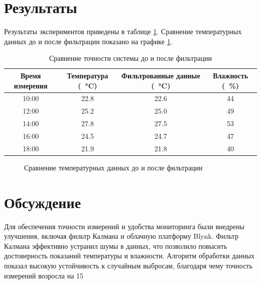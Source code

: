 \documentclass[a4paper,12pt]{article}
\begin{document}
\section{Результаты}
Результаты экспериментов приведены в таблице \ref{tab:results}. Сравнение температурных данных до и после фильтрации показано на графике \ref{fig:temp_graph}.

\begin{table}[H]
    \centering
    \caption{Сравнение точности системы до и после фильтрации}
    \begin{tabular}{|c|c|c|c|}
        \hline
        \textbf{Время измерения} & \textbf{Температура (\SI{}{\degreeCelsius})} & \textbf{Фильтрованные данные (\SI{}{\degreeCelsius})} & \textbf{Влажность (\SI{}{\percent})} \\ \hline
        10:00 & 22.8 & 22.6 & 44 \\ \hline
        12:00 & 25.2 & 25.0 & 49 \\ \hline
        14:00 & 27.8 & 27.5 & 53 \\ \hline
        16:00 & 24.5 & 24.7 & 47 \\ \hline
        18:00 & 21.9 & 21.8 & 40 \\ \hline
    \end{tabular}
    \label{tab:results}
\end{table}

\begin{figure}[H]
    \centering
    \caption{Сравнение температурных данных до и после фильтрации}
    \label{fig:temp_graph}
\end{figure}

\section{Обсуждение}
Для обеспечения точности измерений и удобства мониторинга были внедрены улучшения, включая фильтр Калмана и облачную платформу Blynk. Фильтр Калмана эффективно устранил шумы в данных, что позволило повысить достоверность показаний температуры и влажности. Алгоритм обработки данных показал высокую устойчивость к случайным выбросам, благодаря чему точность измерений возросла на 15%
\end{document}
